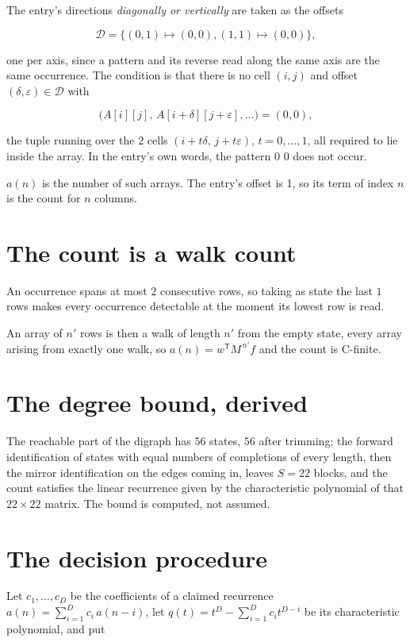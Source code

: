 \documentclass[11pt]{article}
\theoremstyle{definition}
\begin{document}
The entry's directions {\itshape diagonally or vertically} are taken as the offsets

\[\mathcal{D} = \{(0,1)\mapsto(0,0), (1,1)\mapsto(0,0)\},\]

one per axis, since a pattern and its reverse read along the same axis are the same occurrence. The condition is that there is no cell $(i,j)$ and offset $(\delta,\varepsilon)\in\mathcal{D}$ with

\[\bigl(A[i][j],\,A[i{+}\delta][j{+}\varepsilon],\dots\bigr) = (0, 0),\]

the tuple running over the $2$ cells $(i+t\delta,\,j+t\varepsilon)$, $t = 0,\dots,1$, all required to lie inside the array. In the entry's own words, the pattern 0 0 does not occur.

$a(n)$ is the number of such arrays. The entry's offset is 1, so its term of index $n$ is the count for $n$ columns.

\section{The count is a walk count}

An occurrence spans at most $2$ consecutive rows, so taking as state the last $1$ rows makes every occurrence detectable at the moment its lowest row is read.

An array of $n'$ rows is then a walk of length $n'$ from the empty state, every array arising from exactly one walk, so $a(n) = w^{\mathsf T}M^{\,n'}f$ and the count is C-finite.

\section{The degree bound, derived}

The reachable part of the digraph has $56$ states, $56$ after trimming; the forward identification of states with equal numbers of completions of every length, then the mirror identification on the edges coming in, leaves $S = 22$ blocks, and the count satisfies the linear recurrence given by the characteristic polynomial of that $22\times22$ matrix. The bound is computed, not assumed.

\section{The decision procedure}

Let $c_1,\dots,c_D$ be the coefficients of a claimed recurrence $a(n) = \sum_{i=1}^{D} c_i\,a(n-i)$, let $q(t) = t^{D} - \sum_{i=1}^{D} c_i t^{D-i}$ be its characteristic polynomial, and put
\end{document}

